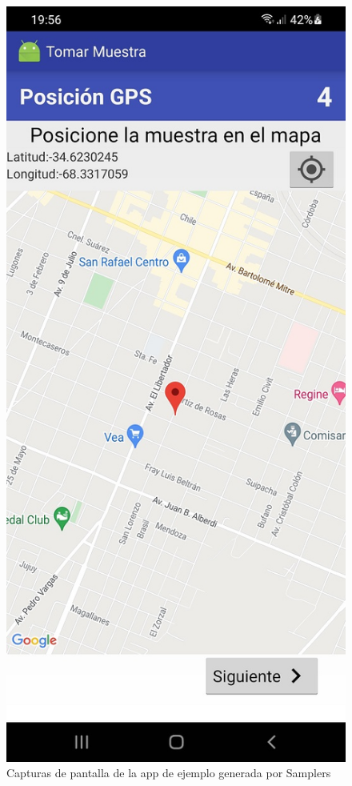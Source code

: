 \begin{figure}[H]
\begin{center}
   \includegraphics[scale=0.3]{05-implementacion/app_generada_ejemplo4.jpg}       
   \end{center}
   
   \caption{Capturas de pantalla de la app de ejemplo generada por Samplers}
   \label{fig:capturas_app_ejemplo}
\end{figure}

